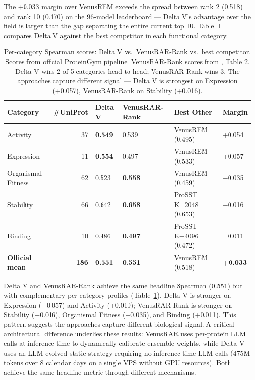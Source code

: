 \documentclass[11pt,a4paper]{article}
\begin{document}
The +0.033 margin over VenusREM exceeds the spread between rank 2 (0.518) and rank 10 (0.470) on the 96-model leaderboard --- Delta V's advantage over the field is larger than the gap separating the entire current top 10. Table~\ref{tab:pg_categories} compares Delta V against the best competitor in each functional category.

\begin{table}[H]
\centering
\caption{Per-category Spearman scores: Delta V vs.\ VenusRAR-Rank vs.\ best competitor. Scores from official ProteinGym pipeline. VenusRAR-Rank scores from \citet{tan2026venusrar}, Table 2. Delta V wins 2 of 5 categories head-to-head; VenusRAR-Rank wins 3. The approaches capture different signal --- Delta V is strongest on Expression (+0.057), VenusRAR-Rank on Stability (+0.016).}
\label{tab:pg_categories}
\small
\begin{tabular}{lrllll}
\toprule
Category & \#UniProt & Delta V & VenusRAR-Rank & Best Other & Margin \\
\midrule
Activity            & 37 & \textbf{0.549} & 0.539 & VenusREM (0.495)         & +0.054 \\
Expression          & 11 & \textbf{0.554} & 0.497 & VenusREM (0.533)         & +0.057 \\
Organismal Fitness  & 62 & 0.523 & \textbf{0.558} & VenusREM (0.459)         & $-$0.035 \\
Stability           & 66 & 0.642 & \textbf{0.658} & ProSST K=2048 (0.653)    & $-$0.016 \\
Binding             & 10 & 0.486 & \textbf{0.497} & ProSST K=4096 (0.472)    & $-$0.011 \\
\midrule
\textbf{Official mean} & \textbf{186} & \textbf{0.551} & \textbf{0.551} & VenusREM (0.518)          & \textbf{+0.033} \\
\bottomrule
\end{tabular}
\end{table}

Delta V and VenusRAR-Rank achieve the same headline Spearman (0.551) but with complementary per-category profiles (Table~\ref{tab:pg_categories}). Delta V is stronger on Expression (+0.057) and Activity (+0.010); VenusRAR-Rank is stronger on Stability (+0.016), Organismal Fitness (+0.035), and Binding (+0.011). This pattern suggests the approaches capture different biological signal. A critical architectural difference underlies these results: VenusRAR uses per-protein LLM calls at inference time to dynamically calibrate ensemble weights, while Delta V uses an LLM-evolved static strategy requiring no inference-time LLM calls (475M tokens over 8 calendar days on a single VPS without GPU resources). Both achieve the same headline metric through different mechanisms.
\end{document}
